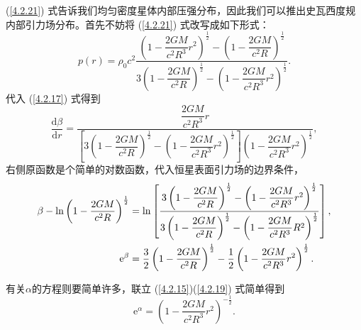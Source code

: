 \documentclass[11pt, a4paper, oneside, onecolumn]{ctexart}
\numberwithin{equation}{subsection}
\begin{document}
(\ref{4.2.21}) 式告诉我们均匀密度星体内部压强分布，因此我们可以推出史瓦西度规内部引力场分布。首先不妨将 (\ref{4.2.21}) 式改写成如下形式：
\begin{equation}
p\left(r\right)=\rho_{0}c^{2}\frac{\left(1-\dfrac{2GM}{c^{2}R^{3}}r^{2}\right)^{\frac{1}{2}}-\left(1-\dfrac{2GM}{c^{2}R}\right)^{\frac12}}{3\left(1-\dfrac{2GM}{c^{2}R}\right)^{\frac12}-\left(1-\dfrac{2GM}{c^{2}R^{3}}r^{2}\right)^{\frac{1}{2}}}.
\end{equation}
代入 (\ref{4.2.17}) 式得到
\begin{equation}
\frac{\mathrm{d}\beta}{\mathrm{d}r}=\frac{\dfrac{2GM}{c^{2}R^{3}}r}{\left[3\left(1-\dfrac{2GM}{c^{2}R}\right)^{\frac12}-\left(1-\dfrac{2GM}{c^{2}R^{3}}r^{2}\right)^{\frac{1}{2}}\right]\left(1-\dfrac{2GM}{c^{2}R^{3}}r^{2}\right)^{\frac{1}{2}}},
\end{equation}
右侧原函数是个简单的对数函数，代入恒星表面引力场的边界条件，
\begin{align}
\beta-\ln\left(1-\frac{2GM}{c^{2}R}\right)^{\frac{1}{2}}&=\ln\left[\dfrac{3\left(1-\dfrac{2GM}{c^{2}R}\right)^{\frac12}-\left(1-\dfrac{2GM}{c^{2}R^{3}}r^{2}\right)^{\frac{1}{2}}}{3\left(1-\dfrac{2GM}{c^{2}R}\right)^{\frac12}-\left(1-\dfrac{2GM}{c^{2}R^{3}}R^{2}\right)^{\frac{1}{2}}}\right],\notag\\
\mathrm{e}^{\beta}&=\frac{3}{2}\left(1-\dfrac{2GM}{c^{2}R}\right)^{\frac12}-\frac{1}{2}\left(1-\dfrac{2GM}{c^{2}R^{3}}r^{2}\right)^{\frac{1}{2}}.
\end{align}

有关$\alpha$的方程则要简单许多，联立 (\ref{4.2.15})(\ref{4.2.19}) 式简单得到
\begin{equation}
\mathrm{e}^{\alpha}=\left(1-\frac{2GM}{c^{2}R^{3}}r^{2}\right)^{-\frac{1}{2}}.
\end{equation}
\end{document}
